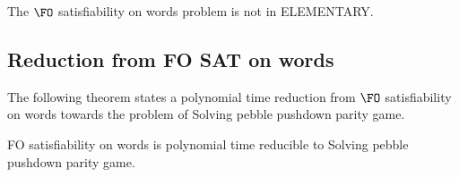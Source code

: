 \documentclass[a4paper,UKenglish,cleveref, autoref, thm-restate]{lipics-v2021}
\begin{document}
\begin{theorem}\label{FOnonelementary}



The {\sc $\FO$ satisfiability on words} problem is not in {\sc ELEMENTARY}.
\end{theorem}





\subsection{Reduction from FO SAT on words}

The following theorem states a polynomial time reduction from
{\sc $\FO$ satisfiability on words}
towards the problem of %
{\sc Solving pebble pushdown parity game}.




\begin{samepage}
\begin{theorem}
{\sc FO satisfiability on words} is polynomial time reducible to {\sc Solving pebble pushdown parity game}.
\end{theorem}
\end{samepage}
\end{document}
